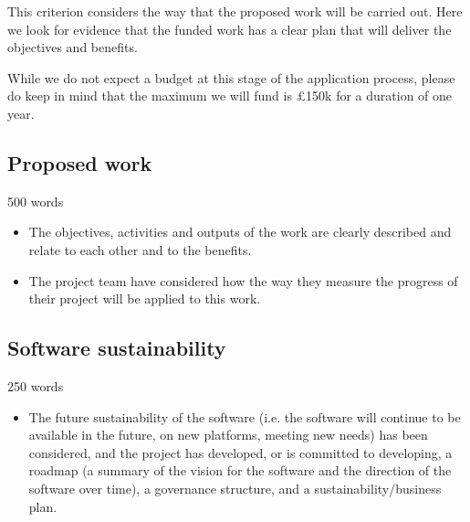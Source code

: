 \documentclass[12pt]{article}
\newenvironment{instruction}{%
    \begin{tcolorbox}[breakable,colback=red!5,colframe=red,title=Instruction]%
	}{%
    	\end{tcolorbox}%
	}
\begin{document}
\begin{instruction}

This criterion considers the way that the proposed work will be carried out.
Here we look for evidence that the funded work has a clear plan that will
deliver the objectives and benefits.

While we do not expect a budget at this stage of the application process,
please do keep in mind that the maximum we will fund is £150k for a duration of
one year.

\end{instruction}

\subsection{Proposed work}

\begin{instruction}

    500 words

    \begin{itemize}

        \item The objectives, activities and outputs of the work are clearly
            described and relate to each other and to the benefits.

        \item The project team have considered how the way they measure the
            progress of their project will be applied to this work.

    \end{itemize}

\end{instruction}



\subsection{Software sustainability}

\begin{instruction}

    250 words

    \begin{itemize}

        \item The future sustainability of the software (i.e. the software will
            continue to be available in the future, on new platforms, meeting
            new needs) has been considered, and the project has developed, or
            is committed to developing, a roadmap (a summary of the vision for
            the software and the direction of the software over time), a
            governance structure, and a sustainability/business plan.

    \end{itemize}

\end{instruction}
\end{document}

